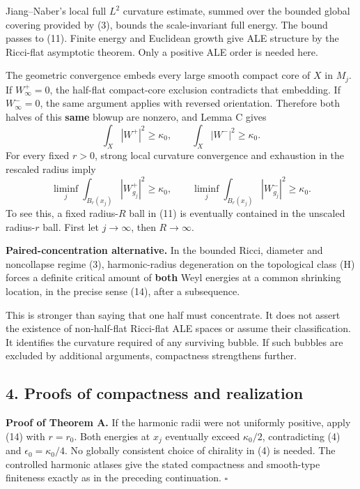 \documentclass[
  11pt,
]{article}
\begin{document}
Jiang--Naber's local full \(L^2\) curvature estimate, summed over the
bounded global covering provided by (3), bounds the scale-invariant full
energy. The bound passes to (11). Finite energy and Euclidean growth
give ALE structure by the Ricci-flat asymptotic theorem. Only a positive
ALE order is needed here.

The geometric convergence embeds every large smooth compact core of
\(X\) in \(M_j\). If \(W^+_\infty=0\), the half-flat compact-core
exclusion contradicts that embedding. If \(W^-_\infty=0\), the same
argument applies with reversed orientation. Therefore both halves of
this \textbf{same} blowup are nonzero, and Lemma C gives \[
              \int_X|W^+|^2\ge\kappa_0,\qquad
              \int_X|W^-|^2\ge\kappa_0.                  \tag{13}
\] For every fixed \(r>0\), strong local curvature convergence and
exhaustion in the rescaled radius imply \[
 \liminf_j\int_{B_r(x_j)}|W^+_{g_j}|^2\ge\kappa_0,\qquad
 \liminf_j\int_{B_r(x_j)}|W^-_{g_j}|^2\ge\kappa_0.          \tag{14}
\] To see this, a fixed radius-\(R\) ball in (11) is eventually
contained in the unscaled radius-\(r\) ball. First let \(j\to\infty\),
then \(R\to\infty\).

\textbf{Paired-concentration alternative.} In the bounded Ricci,
diameter and noncollapse regime (3), harmonic-radius degeneration on the
topological class (H) forces a definite critical amount of \textbf{both}
Weyl energies at a common shrinking location, in the precise sense (14),
after a subsequence.

This is stronger than saying that one half must concentrate. It does not
assert the existence of non-half-flat Ricci-flat ALE spaces or assume
their classification. It identifies the curvature required of any
surviving bubble. If such bubbles are excluded by additional arguments,
compactness strengthens further.

\hypertarget{proofs-of-compactness-and-realization}{%
\subsection{4. Proofs of compactness and
realization}\label{proofs-of-compactness-and-realization}}

\textbf{Proof of Theorem A.} If the harmonic radii were not uniformly
positive, apply (14) with \(r=r_0\). Both energies at \(x_j\) eventually
exceed \(\kappa_0/2\), contradicting (4) and \(\epsilon_0=\kappa_0/4\).
No globally consistent choice of chirality in (4) is needed. The
controlled harmonic atlases give the stated compactness and smooth-type
finiteness exactly as in the preceding continuation. \(\square\)
\end{document}
